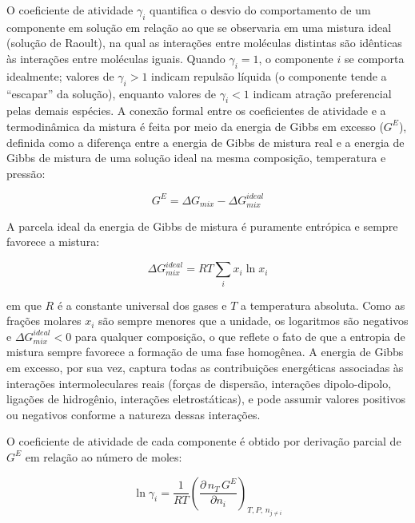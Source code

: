 
O coeficiente de atividade $\gamma_i$ quantifica o desvio do comportamento de um componente em solução em relação ao que se observaria em uma mistura ideal (solução de Raoult), na qual as interações entre moléculas distintas são idênticas às interações entre moléculas iguais. Quando $\gamma_i = 1$, o componente $i$ se comporta idealmente; valores de $\gamma_i > 1$ indicam repulsão líquida (o componente tende a ``escapar'' da solução), enquanto valores de $\gamma_i < 1$ indicam atração preferencial pelas demais espécies\cite{smith2005}. A conexão formal entre os coeficientes de atividade e a termodinâmica da mistura é feita por meio da energia de Gibbs em excesso ($G^E$), definida como a diferença entre a energia de Gibbs de mistura real e a energia de Gibbs de mistura de uma solução ideal na mesma composição, temperatura e pressão:

\begin{equation}
    G^E = \Delta G_{mix} - \Delta G_{mix}^{ideal}
    \label{eq:gexcesso_def}
\end{equation}

A parcela ideal da energia de Gibbs de mistura é puramente entrópica e
sempre favorece a mistura:

\begin{equation}
    \Delta G_{mix}^{ideal} = RT \sum_{i} x_i \ln x_i
    \label{eq:gmix_ideal}
\end{equation}

\noindent em que $R$ é a constante universal dos gases e $T$ a temperatura absoluta. Como as frações molares $x_i$ são sempre menores que a unidade, os logaritmos são negativos e $\Delta G_{mix}^{ideal} < 0$ para qualquer composição, o que reflete o fato de que a entropia de mistura sempre favorece a formação de uma fase homogênea. A energia de Gibbs em excesso, por sua vez, captura todas as contribuições energéticas associadas às interações intermoleculares reais (forças de dispersão, interações dipolo-dipolo, ligações de hidrogênio, interações eletrostáticas), e pode assumir valores positivos ou negativos conforme a natureza dessas interações\cite{smith2005}.

O coeficiente de atividade de cada componente é obtido por derivação parcial de $G^E$ em relação ao número de moles:

\begin{equation}
    \ln \gamma_i = \frac{1}{RT}
    \left(
        \frac{\partial \, n_T \, G^E}{\partial n_i}
    \right)_{T, P, \, n_{j \neq i}}
    \label{eq:gamma_de_gexcesso}
\end{equation}


